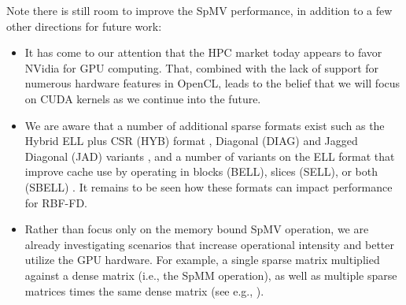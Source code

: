 \documentclass{report}
\begin{document}
Note there is still room to improve the SpMV performance, in addition to a few other directions for future work:
\begin{itemize} 
\item 
It has come to our attention that the HPC market today appears to favor NVidia for GPU computing. %
That, combined with the lack of support for numerous hardware features in OpenCL, leads to the belief that we will focus on CUDA kernels as we continue into the future. 

\item We are aware that a number of additional sparse formats exist such as the Hybrid ELL plus CSR (HYB) format \cite{Bell2009}, Diagonal (DIAG) and Jagged Diagonal (JAD) variants \cite{LiSaad2010}, and a number of variants on the ELL format that improve cache use by operating in blocks (BELL), slices (SELL), or both (SBELL) \cite{SuKeutzer2012}. It remains to be seen how these formats can impact performance for RBF-FD. 

\item Rather than focus only on the memory bound SpMV operation, we are already investigating scenarios that increase operational intensity and better utilize the GPU hardware. For example, a single sparse matrix multiplied against a dense matrix (i.e., the SpMM operation), as well as multiple sparse matrices times the same dense matrix (see e.g., \cite{ErlebacherSauleFlyerBollig2013}). 
\end{itemize}



\ifstandalone


\end{document}
